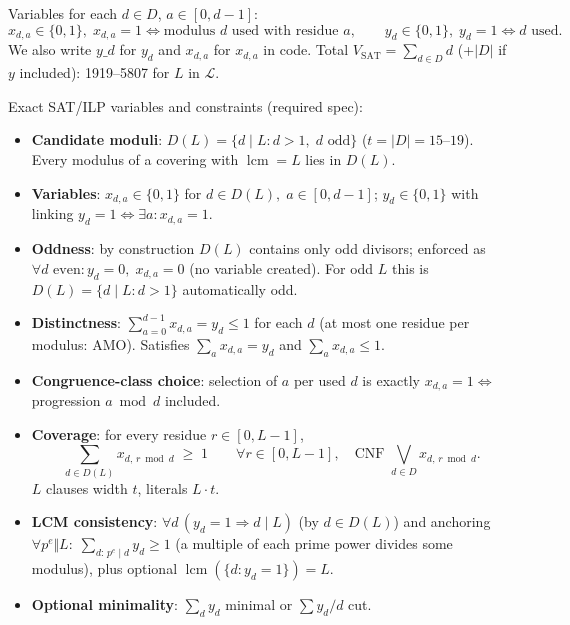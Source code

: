 \documentclass[11pt,a4paper]{article}
\theoremstyle{plain}
\theoremstyle{definition}
\theoremstyle{remark}
\begin{document}
Variables for each $d\in D$, $a\in[0,d-1]$:
\[
x_{d,a}\in\{0,1\},\;x_{d,a}=1\iff\text{modulus }d\text{ used with residue }a,\qquad y_{d}\in\{0,1\},\;y_{d}=1\iff d\text{ used}.
\]
We also write $y\_d$ for $y_{d}$ and $x_{d,a}$ for $x_{d,a}$ in code. Total $V_{\mathrm{SAT}}=\sum_{d\in D}d$ (+$|D|$ if $y$ included): 1919--5807 for $L$ in $\mathcal L$.

Exact SAT/ILP variables and constraints (required spec):
\begin{itemize}
\item \textbf{Candidate moduli}: $D(L)=\{d\mid L:d>1,\;d\text{ odd}\}$ ($t=|D|=15$--$19$). Every modulus of a covering with $\operatorname{lcm}=L$ lies in $D(L)$.
\item \textbf{Variables}: $x_{d,a}\in\{0,1\}$ for $d\in D(L),\;a\in[0,d-1]$; $y_{d}\in\{0,1\}$ with linking $y_{d}=1\iff\exists a:x_{d,a}=1$.
\item \textbf{Oddness}: by construction $D(L)$ contains only odd divisors; enforced as $\forall d\text{ even}: y_{d}=0,\;x_{d,a}=0$ (no variable created). For odd $L$ this is $D(L)=\{d\mid L:d>1\}$ automatically odd.
\item \textbf{Distinctness}: $\sum_{a=0}^{d-1}x_{d,a}=y_{d}\le1$ for each $d$ (at most one residue per modulus: AMO). Satisfies $\sum_{a}x_{d,a}=y_{d}$ and $\sum_{a}x_{d,a}\le1$.
\item \textbf{Congruence-class choice}: selection of $a$ per used $d$ is exactly $x_{d,a}=1\iff$ progression $a\bmod d$ included.
\item \textbf{Coverage}: for every residue $r\in[0,L-1]$,
\[
\boxed{\sum_{d\in D(L)} x_{d,\,r\bmod d}\;\ge\;1\qquad\forall r\in[0,L-1]},\quad\text{CNF }\bigvee_{d\in D}x_{d,\,r\bmod d}.
\]
$L$ clauses width $t$, literals $L\cdot t$.
\item \textbf{LCM consistency}: $\forall d\,(y_{d}=1\Rightarrow d\mid L)$ (by $d\in D(L)$) and anchoring $\forall p^{e}\Vert L:\;\sum_{d:\,p^{e}\mid d}y_{d}\ge1$ (a multiple of each prime power divides some modulus), plus optional $\operatorname{lcm}(\{d:y_{d}=1\})=L$.
\item \textbf{Optional minimality}: $\sum_{d}y_{d}$ minimal or $\sum y_{d}/d$ cut.
\end{itemize}
\end{document}
